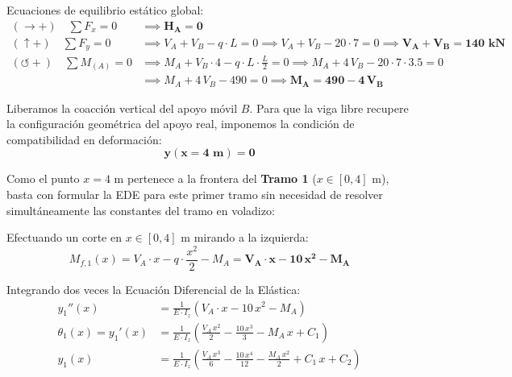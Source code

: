 {    Ecuaciones de equilibrio estático global:
    \begin{align}
        (\rightarrow +) \quad \sum F_x = 0             & \implies \mathbf{H_A = 0}                                                                                                                    \\
        (\uparrow +) \quad \sum F_y = 0                & \implies V_A + V_B - q \cdot L = 0 \implies V_A + V_B - 20 \cdot 7 = 0 \implies \mathbf{V_A + V_B = 140\text{ kN}} \label{eq:ex2_fy}         \\
        (\circlearrowleft +) \quad \sum M_{(A)} = 0    & \implies M_A + V_B \cdot 4 - q \cdot L \cdot \frac{L}{2} = 0 \implies M_A + 4\,V_B - 20 \cdot 7 \cdot 3.5 = 0 \nonumber                    \\
                                                       & \implies M_A + 4\,V_B - 490 = 0 \implies \mathbf{M_A = 490 - 4\,V_B} \label{eq:ex2_ma}
    \end{align}


    Liberamos la coacción vertical del apoyo móvil $B$. Para que la viga libre recupere la configuración geométrica del apoyo real, imponemos la condición de compatibilidad en deformación:
    \begin{equation}
        \mathbf{y(x = 4\text{ m}) = 0}
    \end{equation}

    Como el punto $x = 4\text{ m}$ pertenece a la frontera del \textbf{Tramo 1} ($x \in [0, 4]\text{ m}$), basta con formular la EDE para este primer tramo sin necesidad de resolver simultáneamente las constantes del tramo en voladizo:

    Efectuando un corte en $x \in [0, 4]\text{ m}$ mirando a la izquierda:
    \begin{equation}
        M_{f,1}(x) = V_A \cdot x - q \cdot \frac{x^2}{2} - M_A = \mathbf{V_A \cdot x - 10\,x^2 - M_A}
    \end{equation}

    Integrando dos veces la Ecuación Diferencial de la Elástica:
    \begin{align}
        y_1''(x)           & = \frac{1}{E \cdot I_z}\left(V_A \cdot x - 10\,x^2 - M_A\right)                                                \\
        \theta_1(x) = y_1'(x)& = \frac{1}{E \cdot I_z}\left(\frac{V_A\,x^2}{2} - \frac{10\,x^3}{3} - M_A\,x + C_1\right)                     \\
        y_1(x)             & = \frac{1}{E \cdot I_z}\left(\frac{V_A\,x^3}{6} - \frac{10\,x^4}{12} - \frac{M_A\,x^2}{2} + C_1\,x + C_2\right)
    \end{align}

}

